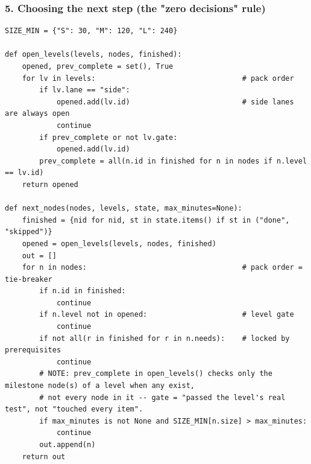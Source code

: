 \hypertarget{hackstreak-spec-v2-5-choosing-the-next-step-the-zero-decisions-rule}{%
\subsubsection{5. Choosing the next step (the "zero decisions"
rule)}\label{hackstreak-spec-v2-5-choosing-the-next-step-the-zero-decisions-rule}}

\begin{verbatim}
SIZE_MIN = {"S": 30, "M": 120, "L": 240}

def open_levels(levels, nodes, finished):
    opened, prev_complete = set(), True
    for lv in levels:                                  # pack order
        if lv.lane == "side":
            opened.add(lv.id)                          # side lanes are always open
            continue
        if prev_complete or not lv.gate:
            opened.add(lv.id)
        prev_complete = all(n.id in finished for n in nodes if n.level == lv.id)
    return opened

def next_nodes(nodes, levels, state, max_minutes=None):
    finished = {nid for nid, st in state.items() if st in ("done", "skipped")}
    opened = open_levels(levels, nodes, finished)
    out = []
    for n in nodes:                                    # pack order = tie-breaker
        if n.id in finished:
            continue
        if n.level not in opened:                      # level gate
            continue
        if not all(r in finished for r in n.needs):    # locked by prerequisites
            continue
        # NOTE: prev_complete in open_levels() checks only the milestone node(s) of a level when any exist,
        # not every node in it -- gate = "passed the level's real test", not "touched every item".
        if max_minutes is not None and SIZE_MIN[n.size] > max_minutes:
            continue
        out.append(n)
    return out
\end{verbatim}

